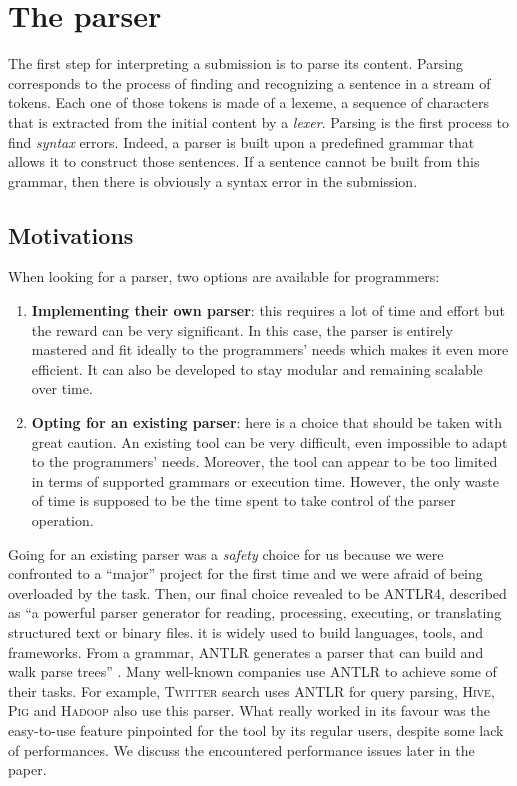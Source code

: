 \documentclass[11pt,a4paper,twoside,openright]{report}
\begin{document}
\section{The parser}

The first step for interpreting a submission is to parse its content. Parsing 
corresponds to the process of finding and recognizing a sentence in a stream 
of tokens. Each one of those tokens is made of a lexeme, a sequence of 
characters that is extracted from the initial content by a \textit{lexer}. 
Parsing is the first process to find \textit{syntax} errors. Indeed, a parser is 
built upon a predefined grammar that allows it to construct those sentences. If 
a sentence cannot be built from this grammar, then there is obviously a syntax 
error in the submission.

\subsection{Motivations}

When looking for a parser, two options are available for programmers:
\begin{enumerate}
 \item \textbf{Implementing their own parser}: this requires a lot of time and 
effort but the reward can be very significant. In this case, the parser is 
entirely mastered and fit ideally to the programmers' needs which makes it even
more efficient. It can also be developed to stay modular and remaining 
scalable over time.
  \item \textbf{Opting for an existing parser}: here is a choice that should be 
taken with great caution. An existing tool can be very difficult, even 
impossible to adapt to the programmers' needs. Moreover, the tool can 
appear to be too limited in terms of supported grammars or execution time. 
However, the only waste of time is supposed to be the time spent to take control 
of the parser operation.
\end{enumerate}
Going for an existing parser was a \textit{safety} choice for us because we 
were confronted to a \enquote{major} project for the first time and we were 
afraid of being overloaded by the task. Then, our final choice revealed to be 
\textsc{ANTLR4}, described as \enquote{a powerful parser generator for 
reading, processing, executing, or translating structured text or binary files. 
it is widely used to build languages, tools, and frameworks. From a grammar, 
\textsc{ANTLR} generates a parser that can build and walk parse 
trees} \cite{antlr}. Many well-known companies use \textsc{ANTLR} to achieve 
some of their tasks. For example, \textsc{Twitter} search uses \textsc{ANTLR} 
for query parsing, \textsc{Hive}, \textsc{Pig} and \textsc{Hadoop} also use 
this parser. What really worked in its favour was the easy-to-use feature pinpointed 
for the tool by its regular users, despite some lack of performances. We 
discuss the encountered performance issues later in the paper.
\end{document}

